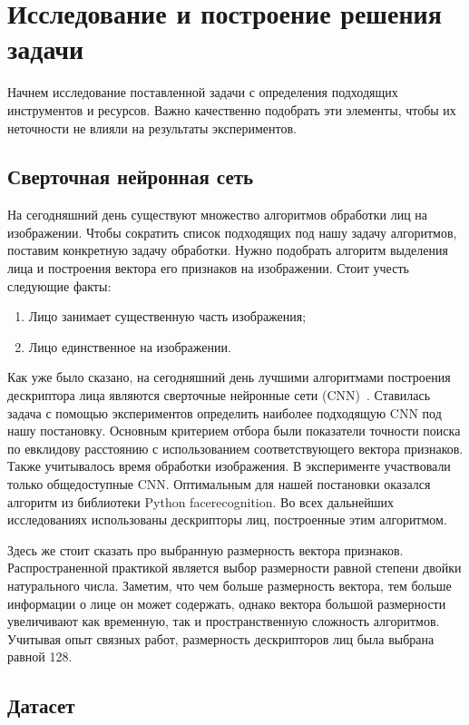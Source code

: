 \section{Исследование и построение решения задачи}
\label{sec:Chapter3} 

Начнем исследование поставленной задачи с определения подходящих инструментов и ресурсов. Важно качественно подобрать эти элементы, чтобы их неточности не влияли на результаты экспериментов.

\subsection{Сверточная нейронная сеть}

На сегодняшний день существуют множество алгоритмов обработки лиц на изображении. Чтобы сократить список подходящих под нашу задачу алгоритмов, поставим конкретную задачу обработки. Нужно подобрать алгоритм выделения лица и построения вектора его признаков на изображении. Стоит учесть следующие факты:
\begin{enumerate}
\item Лицо занимает существенную часть изображения;
\item Лицо единственное на изображении.
\end{enumerate}
Как уже было сказано, на сегодняшний день лучшими алгоритмами построения дескриптора лица являются сверточные нейронные сети (CNN)~\cite{8,10}. Ставилась задача с помощью экспериментов определить наиболее подходящую CNN под нашу постановку. Основным критерием отбора были показатели точности поиска по евклидову расстоянию с использованием соответствующего вектора признаков. Также учитывалось время обработки изображения. В эксперименте участвовали только общедоступные CNN. Оптимальным для нашей постановки оказался алгоритм из библиотеки Python facerecognition. Во всех дальнейших исследованиях использованы дескрипторы лиц, построенные этим алгоритмом.

Здесь же стоит сказать про выбранную размерность вектора признаков. Распространенной практикой является выбор размерности равной степени двойки натурального числа. Заметим, что чем больше размерность вектора, тем больше информации о лице он может содержать, однако вектора большой размерности увеличивают как временную, так и пространственную сложность алгоритмов. Учитывая опыт связных работ, размерность дескрипторов лиц была выбрана равной 128.

\subsection{Датасет}

